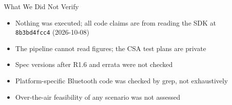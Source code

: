 \documentclass[10pt,aspectratio=169,t]{beamer}
\begin{document}
\begin{frame}{What We Did Not Verify}
\begin{itemize}
  \item Nothing was executed; all code claims are from reading the SDK at
        \texttt{8b3bd4fcc4} (2026-10-08)
  \item The pipeline cannot read figures; the CSA test plans are private
  \item Spec versions after R1.6 and errata were not checked
  \item Platform-specific Bluetooth code was checked by grep, not exhaustively
  \item Over-the-air feasibility of any scenario was not assessed
\end{itemize}
\end{frame}
\end{document}

